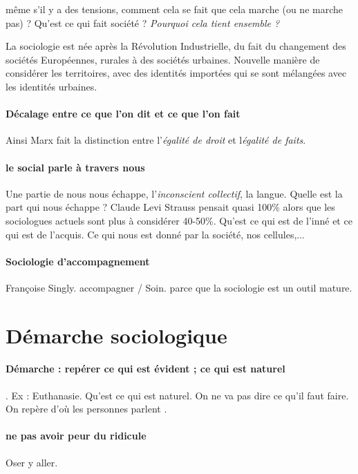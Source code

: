 même s'il y a des tensions, comment cela se fait que cela marche (ou ne marche pas) ? Qu'est ce qui fait société ? \textit{Pourquoi cela tient ensemble ?}

La sociologie est née après la Révolution Industrielle, du fait du changement des sociétés Européennes, rurales à des sociétés urbaines. Nouvelle manière de considérer les territoires, avec des identités importées qui se sont mélangées avec les identités urbaines. 

\paragraph{Décalage entre ce que l'on dit et ce que l'on fait} Ainsi Marx fait la distinction entre l'\textit{égalité de droit} et l\textit{égalité de faits}.  

\paragraph{le social parle à travers nous} Une partie de nous nous échappe, l'\textit{inconscient collectif}, la langue. Quelle est la part qui nous échappe ? Claude Levi Strauss pensait quasi 100\% alors que les sociologues actuels sont plus à considérer 40-50\%. Qu'est ce qui est de l'inné et ce qui est de l'acquis. Ce qui nous est donné par la société,  nos cellules,...

\paragraph{Sociologie d’accompagnement} Françoise Singly. accompagner / Soin. parce que la sociologie est un outil mature.




\section{Démarche sociologique}
\paragraph{Démarche : repérer ce qui est évident ; ce qui est naturel}. Ex : Euthanasie. Qu’est ce qui est naturel. On ne va pas dire ce qu’il faut faire. On repère d’où les personnes parlent . 

\paragraph{ne pas avoir peur du ridicule} Oser y aller. 
